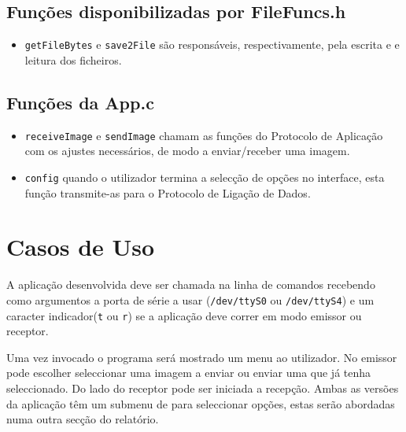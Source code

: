 \documentclass[11pt,a4paper,reqno]{report}
\numberwithin{equation}{section}
\begin{document}
\subsection{Funções disponibilizadas por FileFuncs.h}
\begin{itemize}
\item \verb|getFileBytes| e \verb|save2File| são responsáveis, respectivamente, pela escrita e e leitura dos ficheiros.
\end{itemize}


\subsection{Funções da App.c}
\begin{itemize}
\item \verb|receiveImage| e \verb|sendImage| chamam as funções do Protocolo de Aplicação com os ajustes necessários, de modo a enviar/receber uma imagem.
\item \verb|config| quando o utilizador termina a selecção de opções no interface, esta função transmite-as para o Protocolo de Ligação de Dados.
\end{itemize}


\section{Casos de Uso}

A aplicação desenvolvida deve ser chamada na linha de comandos recebendo como argumentos a porta de série a usar (\verb|/dev/ttyS0| ou \verb|/dev/ttyS4|) e um caracter indicador(\verb|t| ou \verb|r|) se a aplicação deve correr em modo emissor ou receptor.

Uma vez invocado o programa será mostrado um menu ao utilizador. No emissor pode escolher seleccionar uma imagem a enviar ou enviar uma que já tenha seleccionado. Do lado do receptor pode ser iniciada a recepção. Ambas as versões da aplicação têm um submenu de para seleccionar  opções, estas  serão abordadas numa outra secção do relatório.
\end{document}
